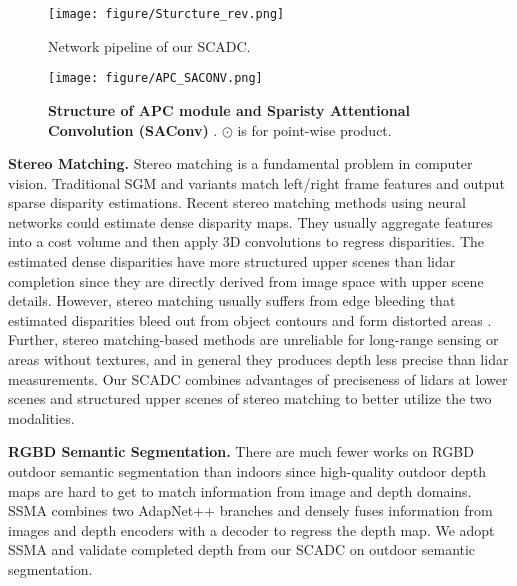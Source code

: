 \documentclass{article}
\begin{document}
\begin{figure*}[hbt!]
    \centering
    \texttt{[image: figure/Sturcture\_rev.png]}
    \vspace{-23pt}
    \caption{Network pipeline of our SCADC.}
    \label{pipeline}
    \vspace{-15pt}
\end{figure*}
\begin{figure}[bt!]
    \centering
    \texttt{[image: figure/APC\_SACONV.png]}
    \vspace{-22pt}
    \caption{\textbf{Structure of APC module and Sparisty Attentional Convolution (SAConv)} \cite{zhong2019deep}. $\odot$ is for point-wise product.}
    \label{APC_SACONV}
    \vspace{-15pt}
\end{figure}

\textbf{Stereo Matching.} Stereo matching is a fundamental problem in computer vision. Traditional SGM and variants \cite{hirschmuller2007stereo,hirschmuller2005accurate,gehrig2009real,hermann2012iterative} match left/right frame features and output sparse disparity estimations. Recent stereo matching methods \cite{chang2018pyramid, Guo_2019_CVPR, Zhang_2019_CVPR} using neural networks could estimate dense disparity maps. They usually aggregate features into a cost volume and then apply 3D convolutions to regress disparities. The estimated dense disparities have more structured upper scenes than lidar completion since they are directly derived from image space with upper scene details. However, stereo matching usually suffers from edge bleeding that estimated disparities bleed out from object contours and form distorted areas \cite{forsyth2003modern,wang2014stereo}. Further, stereo matching-based methods are unreliable for long-range sensing or areas without textures, and in general they produces depth less precise than lidar measurements. Our SCADC combines advantages of preciseness of lidars at lower scenes and structured upper scenes of stereo matching to better utilize the two modalities.

\textbf{RGBD Semantic Segmentation.} There are much fewer works on RGBD outdoor semantic segmentation than indoors since high-quality outdoor depth maps are hard to get to match information from image and depth domains. SSMA \cite{valada19ijcv} combines two AdapNet++ \cite{valada19ijcv} branches and densely fuses information from images and depth encoders with a decoder to regress the depth map. We adopt SSMA and validate completed depth from our SCADC on outdoor semantic segmentation.
\end{document}
